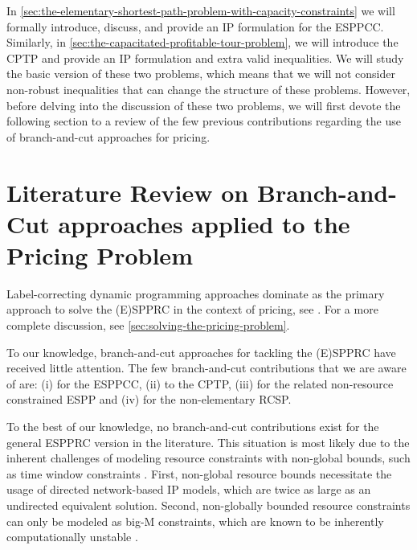 \medskip

In \cref{sec:the-elementary-shortest-path-problem-with-capacity-constraints}
we will formally introduce, discuss, and provide an IP formulation for the ESPPCC.
Similarly, in \cref{sec:the-capacitated-profitable-tour-problem},
we will introduce the CPTP and provide an IP formulation and extra valid inequalities.
We will study the basic version of these two problems,
which means that we will not consider non-robust inequalities
that can change the structure of these problems.
However, before delving into the discussion of these two problems,
we will first devote the following section 
to a review of the few previous contributions regarding
the use of branch-and-cut approaches for pricing.

\section{Literature Review on Branch-and-Cut approaches applied to the Pricing Problem}
\label{sec:bac-approaches-for-the-pricing-problem}

Label-correcting dynamic programming approaches
dominate as the primary approach to solve the (E)SPPRC in the context of pricing,
see \cite{desrochers1992, feillet2004, righini2004, righini2006, boland2006, righini2008, pugliese2010, baldacci2011, lozano2013, lozano2016, sadykov2021bucket}.
For a more complete discussion, see \cref{sec:solving-the-pricing-problem}.

To our knowledge, branch-and-cut approaches for tackling the (E)SPPRC have received little attention.
The few branch-and-cut contributions that we are aware of are:
(i) \textcite{jepsen2008branchandcut} for the ESPPCC,
(ii) \textcite{jepsen2011,jepsen2014} to the CPTP,
(iii) \textcite{taccari2016, drexl2014} for the related non-resource constrained ESPP
and (iv) \textcite{horvath2016} for the non-elementary RCSP.

To the best of our knowledge,
no branch-and-cut contributions exist for the general ESPPRC version in the literature.
This situation is most likely due to the inherent challenges
of modeling resource constraints with non-global bounds,
such as time window constraints \parencite{jepsen2008branchandcut}.
First, non-global resource bounds necessitate the usage
of directed network-based IP models,
which are twice as large as an undirected equivalent solution.
Second, non-globally bounded resource constraints
can only be modeled as big-M constraints,
which are known to be inherently computationally unstable \parencite{jepsen2008branchandcut}.

